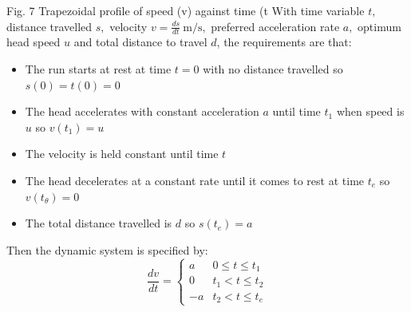 \documentclass{UoNMCHA}
\numberwithin{equation}{section}
\begin{document}
Fig. 7 Trapezoidal profile of speed (v) against time (t
With time variable $t,$ distance travelled $s,$ velocity $v=\frac{d s}{d t} \mathrm{~m} / \mathrm{s},$ preferred acceleration rate $a,$ optimum
head speed $u$ and total distance to travel $d$, the requirements are that:
\begin{itemize}
\item The run starts at rest at time $t=0$ with no distance travelled so $s(0)=t(0)=0$
\item The head accelerates with constant acceleration $a$ until time $t_{1}$ when speed is $u$ so $v\left(t_{1}\right)=u$
\item The velocity is held constant until time $t$
\item The head decelerates at a constant rate until it comes to rest at time $t_{e}$ so $v\left(t_{\theta}\right)=0$
\item The total distance travelled is $d$ so $s\left(t_{e}\right)=a$
\end{itemize}

Then the dynamic system is specified by:
$$
\frac{d v}{d t}=\left\{\begin{array}{ll}
a & 0 \leq t \leq t_{1} \\
0 & t_{1}<t \leq t_{2} \\
-a & t_{2}<t \leq t_{e}
\end{array}\right.
$$
\end{document}
